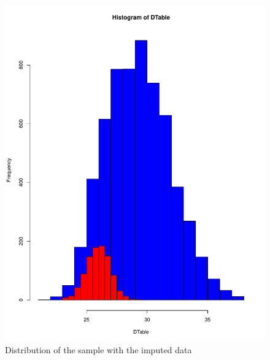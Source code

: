 \documentclass[10pt,a4paper]{article}
\begin{document}
\begin{enumerate}
\begin{figure}
\includegraphics[scale=0.3]{Hist3.pdf}
\caption{Distribution of the sample with the imputed data}
\label{fig-4}
\end{figure}
\begin{figure}

\end{figure}
\end{enumerate}
\end{document}
